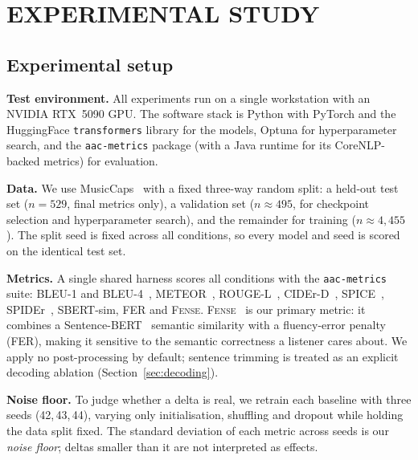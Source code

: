 \documentclass[9pt]{report}
\newcommand{\fense}{\textsc{Fense}}
\begin{document}
\chapter{EXPERIMENTAL STUDY}\label{ch:experiments}

\section{Experimental setup}

\textbf{Test environment.}
All experiments run on a single workstation with an NVIDIA RTX~5090 GPU. The software stack is
Python with PyTorch and the HuggingFace \texttt{transformers} library for the models, Optuna
for hyperparameter search, and the \texttt{aac-metrics} package (with a Java runtime for its
CoreNLP-backed metrics) for evaluation.

\textbf{Data.}
We use MusicCaps~\cite{agostinelli2023musiclm} with a fixed three-way random split: a held-out
test set ($n{=}529$, final metrics only), a validation set ($n{\approx}495$, for checkpoint
selection and hyperparameter search), and the remainder for training ($n{\approx}4{,}455$). The
split seed is fixed across all conditions, so every model and seed is scored on the identical
test set.

\textbf{Metrics.}
A single shared harness scores all conditions with the \texttt{aac-metrics} suite: BLEU-1 and
BLEU-4~\cite{papineni2002bleu}, METEOR~\cite{banerjee2005meteor}, ROUGE-L~\cite{lin2004rouge},
CIDEr-D~\cite{vedantam2015cider}, SPICE~\cite{anderson2016spice}, SPIDEr~\cite{liu2017spider},
SBERT-sim, FER and \fense{}.
\fense{}~\cite{zhou2022fense} is our primary metric: it combines a
Sentence-BERT~\cite{reimers2019sbert} semantic similarity with a fluency-error penalty (FER),
making it sensitive to the semantic correctness a listener cares about. We apply no
post-processing by default; sentence trimming is treated as an explicit decoding ablation
(Section~\ref{sec:decoding}).

\textbf{Noise floor.}
To judge whether a delta is real, we retrain each baseline with three seeds (42,\,43,\,44),
varying only initialisation, shuffling and dropout while holding the data split fixed. The
standard deviation of each metric across seeds is our \emph{noise floor}; deltas smaller than it
are not interpreted as effects.
\end{document}
